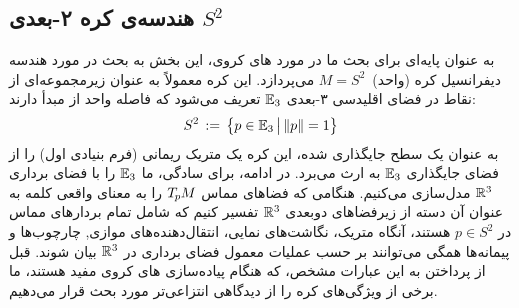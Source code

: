 

\subsection%
    [هندسه‌ی کره ۲-بعدی \texorpdfstring{$S^2$}{S2}]%
    {هندسه‌ی کره ۲-بعدی $S^2$}
\label{sec:sphere_geometry}

به عنوان پایه‌ای برای بحث ما در مورد های کروی، این بخش به بحث در مورد هندسه دیفرانسیل کره (واحد)~$M = S^2$ می‌پردازد.
این کره معمولاً به عنوان زیرمجموعه‌ای از نقاط در فضای اقلیدسی ۳-بعدی $\mathbb{E}_3$ تعریف می‌شود که فاصله واحد از مبدأ دارند:
\begin{align}
    S^2 \,:=\, \big\{ p\in\mathbb{E}_3 \,\big|\, \lVert p\rVert = 1 \big\}
\end{align}
به عنوان یک سطح جایگذاری شده، این کره یک متریک ریمانی (فرم بنیادی اول) را از فضای جایگذاری $\mathbb{E}_3$ به ارث می‌برد.
در ادامه، برای سادگی، ما $\mathbb{E}_3$ را با فضای برداری $\mathbb{R}^3$ مدل‌سازی می‌کنیم.
هنگامی که فضاهای مماس $T_{\mkern-1.5mu p}\mkern-.5muM$ را به معنای واقعی کلمه به عنوان آن دسته از زیرفضاهای دوبعدی $\mathbb{R}^3$ تفسیر کنیم
که شامل تمام بردارهای مماس در $p \in S^2$ هستند، آنگاه متریک، نگاشت‌های نمایی، انتقال‌دهنده‌های موازی, چارچوب‌ها و پیمانه‌ها همگی می‌توانند بر حسب عملیات معمول فضای برداری در $\mathbb{R}^3$ بیان شوند.
قبل از پرداختن به این عبارات مشخص، که هنگام پیاده‌سازی های کروی مفید هستند،
ما برخی از ویژگی‌های کره را از دیدگاهی انتزاعی‌تر مورد بحث قرار می‌دهیم.


